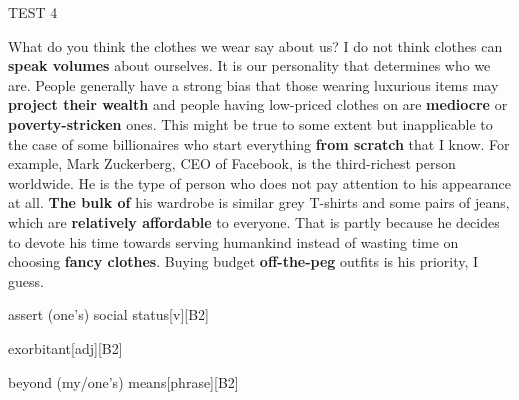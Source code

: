 \begin{glossarymc}[Cambridge 5]
\begin{test}{TEST 4}
    \begin{qa}{What do you think the clothes we wear say about us?}
    I do not think clothes can \textbf{speak volumes} about ourselves. It is our personality that determines who we are. People generally have a strong bias that those wearing luxurious items may \textbf{project their wealth} and people having low-priced clothes on are \textbf{mediocre} or \textbf{poverty-stricken} ones. This might be true to some extent but inapplicable to the case of some billionaires who start everything \textbf{from scratch} that I know. For example, Mark Zuckerberg, CEO of Facebook, is the third-richest person worldwide. He is the type of person who does not pay attention to his appearance at all. \textbf{The bulk of} his wardrobe is similar grey T-shirts and some pairs of jeans, which are \textbf{relatively affordable} to everyone. That is partly because he decides to devote his time towards serving humankind instead of wasting time on choosing \textbf{fancy clothes}. Buying budget \textbf{off-the-peg} outfits is his priority, I guess.
    \end{qa}

        \begin{VocabExplain}[Part 1]
            \begin{ExplainCard}{assert (one's) social status}[v][B2]
            \end{ExplainCard}

            \begin{ExplainCard}{exorbitant}[adj][B2]
            \end{ExplainCard}

            \begin{ExplainCard}{beyond (my/one’s) means}[phrase][B2]
            \end{ExplainCard}


\end{VocabExplain}
\end{test}
\end{glossarymc}
